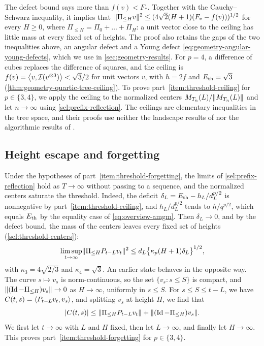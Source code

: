 The defect bound says more than $f(v)<F_*$. Together with the Cauchy--Schwarz inequality, it implies that $\lVert\Pi_{\le H}v\rVert^2\le(4\sqrt2(H+1)(F_*-f(v)))^{1/2}$ for every $H\ge0$, where $\Pi_{\le H}=\Pi_0+\dots+\Pi_H$: a unit vector close to the ceiling has little mass at every fixed set of heights. The proof also retains the gaps of the two inequalities above, an angular defect and a Young defect \eqref{eq:geometry-angular-young-defects}, which we use in \cref{sec:geometry-results}. For $p=4$, a difference of cubes replaces the difference of squares, and the ceiling is $f(v)=\left\langle v,\mathcal I(v^{\otimes3})\right\rangle<\sqrt3/2$ for unit vectors $v$, with $h=2f$ and $E_{\mathrm{th}}=\sqrt3$ (\cref{thm:geometry-quartic-tree-ceiling}). To prove part~\ref{item:threshold-ceiling} for $p\in\{3,4\}$, we apply the ceiling to the normalized centers $M_{T_n}(L)/\lVert M_{T_n}(L)\rVert$ and let $n\to\infty$ using \cref{sel:prefix-reflection}. The ceilings are elementary inequalities in the tree space, and their proofs use neither the landscape results of \cite{abc2013} nor the algorithmic results of \cite{hs2021,hs2023}.

\subsection{Height escape and forgetting}
Under the hypotheses of part~\ref{item:threshold-forgetting}, the limits of \cref{sel:prefix-reflection} hold as $T\to\infty$ without passing to a sequence, and the normalized centers saturate the threshold. Indeed, the deficit $\delta_L=E_{\mathrm{th}}-h_L/d_L^{p/2}$ is nonnegative by part~\ref{item:threshold-ceiling}, and $h_L/d_L^{p/2}$ tends to $h/q^{p/2}$, which equals $E_{\mathrm{th}}$ by the equality case of \eqref{eq:overview-amgm}. Then $\delta_L\to0$, and by the defect bound, the mass of the centers leaves every fixed set of heights (\cref{sel:threshold-centers}):
\[
 \limsup_{t\to\infty}\lVert\Pi_{\le H}P_{t-L}v_t\rVert^2\le d_L\bigl\{\kappa_p(H+1)\delta_L\bigr\}^{1/2},
\]
with $\kappa_3=4\sqrt{2/3}$ and $\kappa_4=\sqrt3$. An earlier state behaves in the opposite way. The curve $s\mapsto v_s$ is norm-continuous, so the set $\{v_s:s\le S\}$ is compact, and $\lVert(\operatorname{Id}-\Pi_{\le H})v_s\rVert\to0$ as $H\to\infty$, uniformly in $s\le S$. For $s\le S\le t-L$, we have $C(t,s)=\left\langle P_{t-L}v_t,v_s\right\rangle$, and splitting $v_s$ at height $H$, we find that
\[
 |C(t,s)|\le\lVert\Pi_{\le H}P_{t-L}v_t\rVert+\lVert(\operatorname{Id}-\Pi_{\le H})v_s\rVert .
\]
We first let $t\to\infty$ with $L$ and $H$ fixed, then let $L\to\infty$, and finally let $H\to\infty$. This proves part~\ref{item:threshold-forgetting} for $p\in\{3,4\}$.


